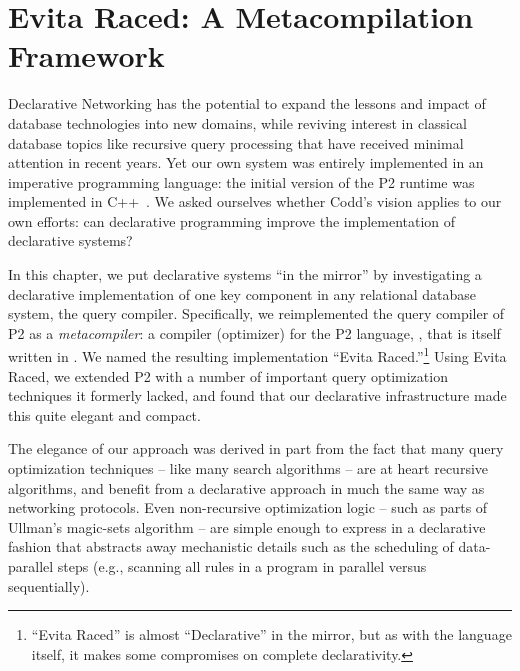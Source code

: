 \chapter[Evita Raced]{Evita Raced: A Metacompilation Framework}
\label{ch:evita}

Declarative Networking has the potential to expand the lessons and impact of
database technologies into new domains, while reviving interest in classical
database topics like recursive query processing that have received minimal
attention in recent years.  Yet our own system was entirely implemented in an
imperative programming language: the initial version of the P2 runtime was
implemented in C++~\cite{p2:sosp}.  We asked ourselves whether Codd's vision
applies to our own efforts: can declarative programming improve the
implementation of declarative systems?

In this chapter, we put declarative systems ``in the mirror'' by investigating
a declarative implementation of one key component in any relational database
system, the query compiler.  Specifically, we reimplemented the query
compiler of P2 as a {\em metacompiler}: a compiler (optimizer) for the P2
language, \OVERLOG, that is itself written in \OVERLOG.  We named the resulting
implementation ``Evita Raced.''\footnote{``Evita Raced'' is almost
``Declarative'' in the mirror, but as with the \OVERLOG language itself, it
makes some compromises on complete declarativity.} Using Evita Raced, we
extended P2 with a number of important query optimization techniques it
formerly lacked, and found that our declarative infrastructure made this quite
elegant and compact.  

The elegance of our approach was derived in part from the fact that many query
optimization techniques -- like many search algorithms -- are at heart
recursive algorithms, and benefit from a declarative approach in much the same
way as networking protocols.  Even non-recursive optimization logic -- such as
parts of Ullman's magic-sets algorithm -- are simple enough to express in a
declarative fashion that abstracts away mechanistic details such as the
scheduling of data-parallel steps (e.g., scanning all rules in a program in
parallel versus sequentially).

